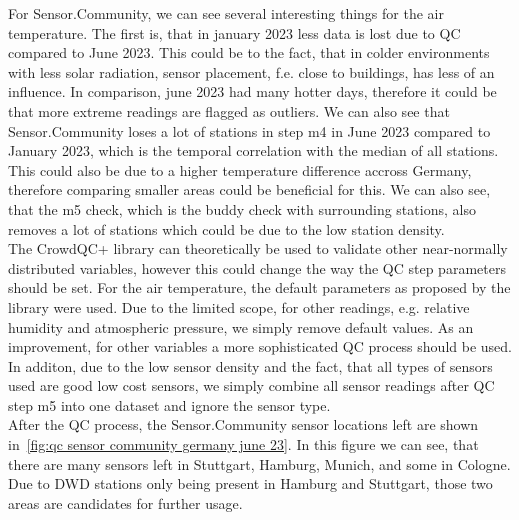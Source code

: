 For Sensor.Community, we can see several interesting things for the air temperature. The first is, that in january 2023 less data is lost due to QC compared to June 2023. This could be to the fact, that in colder environments with less solar radiation, sensor placement, f.e. close to buildings, has less of an influence. In comparison, june 2023 had many hotter days, therefore it could be that more extreme readings are flagged as outliers. We can also see that Sensor.Community loses a lot of stations in step m4 in June 2023 compared to January 2023, which is the temporal correlation with the median of all stations. This could also be due to a higher temperature difference accross Germany, therefore comparing smaller areas could be beneficial for this. We can also see, that the m5 check, which is the buddy check with surrounding stations, also removes a lot of stations which could be due to the low station density.\\
The CrowdQC+ library can theoretically be used to validate other near-normally distributed variables, however this could change the way the QC step parameters should be set. For the air temperature, the default parameters as proposed by the library were used. Due to the limited scope, for other readings, e.g. relative humidity and atmospheric pressure, we simply remove default values. As an improvement, for other variables a more sophisticated QC process should be used. In additon, due to the low sensor density and the fact, that all types of sensors used are good low cost sensors, we simply combine all sensor readings after QC step m5 into one dataset and ignore the sensor type.\\
After the QC process, the Sensor.Community sensor locations left are shown in~\ref{fig:qc sensor community germany june 23}. In this figure we can see, that there are many sensors left in Stuttgart, Hamburg, Munich, and some in Cologne. Due to DWD stations only being present in Hamburg and Stuttgart, those two areas are candidates for further usage.


